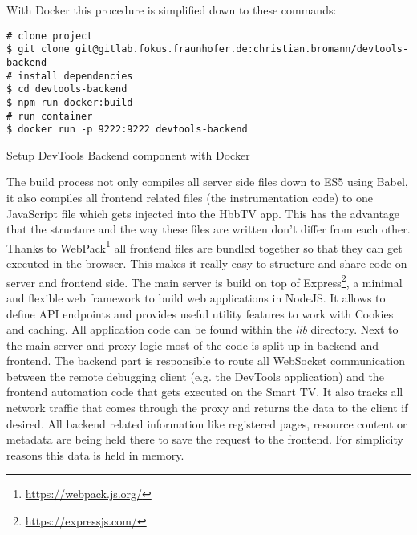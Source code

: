 With Docker this procedure is simplified down to these commands:

\vspace{1cm}
\begin{listing}[H]
\begin{verbatim}
# clone project
$ git clone git@gitlab.fokus.fraunhofer.de:christian.bromann/devtools-backend
# install dependencies
$ cd devtools-backend
$ npm run docker:build
# run container
$ docker run -p 9222:9222 devtools-backend
\end{verbatim}
\caption{Setup DevTools Backend component with Docker}
\label{lst:setupdevtools}
\end{listing}
\vspace{0.5cm}

The build process not only compiles all server side files down to ES5 using Babel, it also compiles all frontend related files (the instrumentation code) to one JavaScript file which gets injected into the HbbTV app. This has the advantage that the structure and the way these files are written don't differ from each other. Thanks to WebPack\footnote{\url{https://webpack.js.org/}} all frontend files are bundled together so that they can get executed in the browser. This makes it really easy to structure and share code on server and frontend side. The main server is build on top of Express\footnote{\url{https://expressjs.com/}}, a minimal and flexible web framework to build web applications in NodeJS. It allows to define API endpoints and provides useful utility features to work with Cookies and caching. All application code can be found within the \textit{lib} directory. Next to the main server and proxy logic most of the code is split up in backend and frontend. The backend part is responsible to route all WebSocket communication between the remote debugging client (e.g. the DevTools application) and the frontend automation code that gets executed on the Smart TV. It also tracks all network traffic that comes through the proxy and returns the data to the client if desired. All backend related information like registered pages, resource content or metadata are being held there to save the request to the frontend. For simplicity reasons this data is held in memory.

